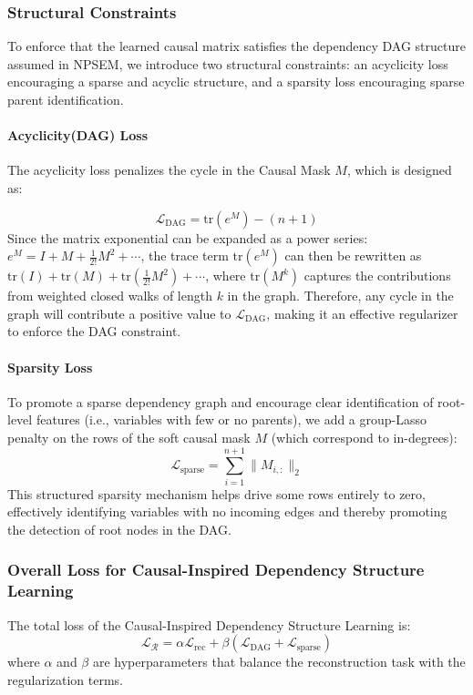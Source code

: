 \documentclass[conference]{IEEEtran}
\newcommand{\rl}[1]{{\color{black}#1}}
\newcommand{\sy}[1]{{\color{black}#1}}
\newcommand{\syne}[1]{{\color{black}#1}}
\newcommand{\syic}[1]{{\color{black}#1}}
\newcommand{\syone}[1]{{\color{black}#1}}
\begin{document}
\subsubsection{\syic{Structural} Constraints}
\rl{To enforce that the learned causal matrix satisfies the \syic{dependency} DAG structure assumed in NPSEM, we introduce two structural constraints: an \sy{acyclicity loss} \syone{encouraging a sparse and} acyclic structure, and a sparsity loss encouraging sparse \syic{parent} identification.}

\paragraph{Acyclicity(DAG) Loss}
The \sy{acyclicity loss} penalizes the cycle in the Causal Mask $M$, which is designed as:

\begin{equation}
    \mathcal{L}_{\text{DAG}} = \mathrm{tr}(e^M) - (n+1)
    \label{eq:dag-loss}
\end{equation}
Since the matrix exponential can be expanded as a power series: $e^M = I + M + \frac{1}{2!}M^2 + \cdots$, the trace term $\mathrm{tr}(e^M)$ can then be rewritten as $\mathrm{tr}(I) + \mathrm{tr}(M) + \mathrm{tr}(\frac{1}{2!}M^2) + \cdots$, where $\mathrm{tr}(M^k)$ \syic{captures the contributions from weighted closed walks} of length $k$ in the graph. 
Therefore, any cycle in the graph will contribute a positive value to $\mathcal{L}_{\text{DAG}}$, making it an effective regularizer to enforce the DAG constraint.

\paragraph{Sparsity Loss}
To promote a sparse \syic{dependency} graph and encourage clear identification of root-level features (i.e., variables with few or no parents), we add a group-Lasso penalty on the rows of \syne{the soft causal mask $M$} (which correspond to in-degrees):
\begin{equation}
    \mathcal{L}_{\text{sparse}} = \sum_{i=1}^{n+1} \|M_{i, :}\|_2
    \label{eq:sparsity-loss}
\end{equation}
This structured sparsity mechanism helps drive some rows entirely to zero, effectively \syic{identifying variables with no incoming edges and thereby} promoting the detection of root nodes in the DAG.

\subsubsection{Overall Loss for \syic{Causal-Inspired Dependency Structure Learning}}
The total loss of the \syic{Causal-Inspired Dependency Structure Learning} is:
\begin{equation}
    \mathcal{L_{R}} = \alpha\mathcal{L}_{\text{rec}} + \beta(\mathcal{L}_{\text{DAG}} + \mathcal{L}_{\text{sparse}})
    \label{eq:total_reconstruction_loss}
\end{equation}
where $\alpha$ and $\beta$ are hyperparameters \syone{that} balance the reconstruction task with the regularization terms.
\end{document}
